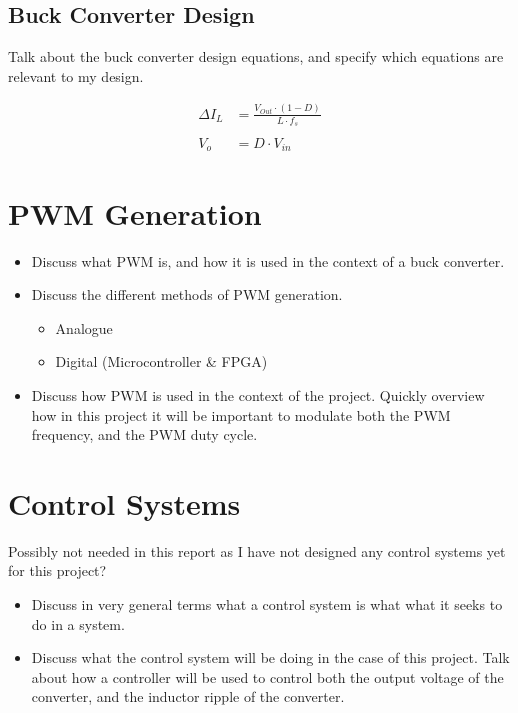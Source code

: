 \subsection{Buck Converter Design}

Talk about the buck converter design equations, and specify which equations are relevant to my design.

\begin{align*}
   \Delta I_L &= \frac{ V_{Out} \cdot \left( 1 - D \right) } {L \cdot f_s}\\\\
   V_o &= D \cdot V_{in}
\end{align*}

\section{PWM Generation}

\begin{itemize}

    \item
          Discuss what PWM is, and how it is used in the context of a buck converter.

    \item
          Discuss the different methods of PWM generation.

          \begin{itemize}
              \item Analogue
              \item Digital (Microcontroller \& FPGA)
          \end{itemize}

    \item
          Discuss how PWM is used in the context of the project. Quickly overview how in this project it will be important to modulate both the PWM frequency, and the PWM duty cycle.

\end{itemize}

\section{Control Systems}

Possibly not needed in this report as I have not designed any control systems yet for this project?

\begin{itemize}

    \item
          Discuss in very general terms what a control system is what what it seeks to do in a system.

    \item
          Discuss what the control system will be doing in the case of this project. Talk about how a controller will be used to control both the output voltage of the converter, and the inductor ripple of the converter.

\end{itemize}